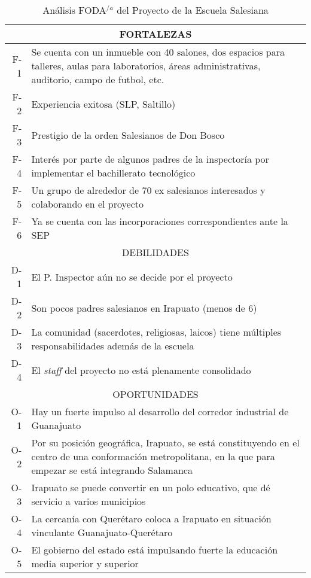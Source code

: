 \begin{table}[h!]
    \centering
    \caption{Análisis FODA$^{/a}$ del Proyecto de la Escuela Salesiana}
    \label{tbl:Foda}
    \footnotesize
    \begin{tabular}{r|p{5in}}
    	\multicolumn{2}{c}{FORTALEZAS} \\
    	\hline
    	\hline
    	F-1 & Se cuenta con un inmueble con 40 salones, dos espacios para talleres, aulas para laboratorios, áreas administrativas, auditorio, campo de futbol, etc. \\
    	F-2 & Experiencia exitosa (SLP, Saltillo) \\
    	F-3 & Prestigio de la orden Salesianos de Don Bosco \\
    	F-4 & Interés por parte de algunos padres de la inspectoría por implementar el bachillerato tecnológico \\
    	F-5 & Un grupo de alrededor de 70 ex salesianos interesados y colaborando en el proyecto \\
    	F-6 & Ya se cuenta con las incorporaciones correspondientes ante la SEP \\
    	\hline
    	\multicolumn{2}{c}{DEBILIDADES} \\
    	\hline
    	\hline
    	D-1 & El P. Inspector aún no se decide por el proyecto \\
    	D-2 & Son pocos padres salesianos en Irapuato (menos de 6) \\
    	D-3 & La comunidad (sacerdotes, religiosas, laicos) tiene múltiples responsabilidades además de la escuela \\
    	D-4 & El \emph{staff} del proyecto no est\'a plenamente consolidado \\
    	\hline
    	\multicolumn{2}{c}{OPORTUNIDADES} \\
    	\hline
    	\hline
    	O-1 & Hay un fuerte impulso al desarrollo del corredor industrial de Guanajuato \\
    	O-2 & Por su posición geográfica, Irapuato, se está constituyendo en el centro de una conformación metropolitana, en la que para empezar se está integrando Salamanca \\
    	O-3 & Irapuato se puede convertir en un polo educativo, que dé servicio a varios municipios \\
    	O-4 & La cercanía con Querétaro coloca a Irapuato en situación vinculante Guanajuato-Querétaro \\
    	O-5 & El gobierno del estado está impulsando fuerte la educación media superior y superior \\

\end{tabular}
\end{table}
